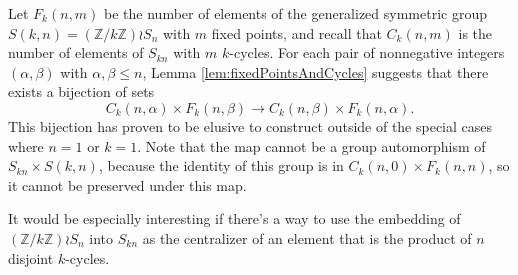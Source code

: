   Let $F_k(n, m)$ be the number of elements of the generalized symmetric group
  $S(k,n) = (\mathbb{Z}/k\mathbb{Z}) \wr S_n$ with $m$ fixed points,
  and recall that $C_k(n,m)$ is the number of elements of $S_{kn}$ with $m$ $k$-cycles.
  For each pair of nonnegative integers $(\alpha, \beta)$
  with $\alpha, \beta \leq n$, Lemma \ref{lem:fixedPointsAndCycles} suggests that
  there exists a bijection of sets \begin{equation}
    C_k(n, \alpha) \times F_k(n, \beta) \rightarrow C_k(n, \beta) \times F_k(n, \alpha).
  \end{equation}
  This bijection has proven to be elusive to construct outside of the special
  cases where $n=1$ or $k=1$.
  Note that the map cannot be a group automorphism of $S_{kn} \times S(k,n)$,
  because the identity of this group is in $C_k(n,0) \times F_k(n,n)$, so it
  cannot be preserved under this map.

  It would be especially interesting if there's a way to use the embedding of
  $(\mathbb{Z}/k\mathbb{Z}) \wr S_n$ into $S_{kn}$ as the centralizer of an
  element that is the product of $n$ disjoint $k$-cycles.
